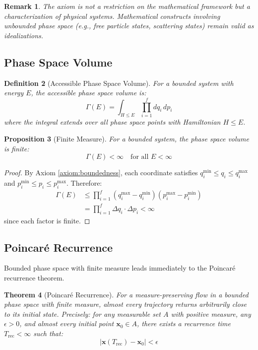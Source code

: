 \documentclass[twocolumn,10pt,twoside]{article}
\newtheorem{theorem}{Theorem}[section]
\newtheorem{proposition}[theorem]{Proposition}
\newtheorem{definition}[theorem]{Definition}
\newtheorem{remark}[theorem]{Remark}
\begin{document}
\begin{remark}
The axiom is not a restriction on the mathematical framework but a characterization of physical systems. Mathematical constructs involving unbounded phase space (e.g., free particle states, scattering states) remain valid as idealizations.
\end{remark}

\subsection{Phase Space Volume}

\begin{definition}[Accessible Phase Space Volume]
For a bounded system with energy $E$, the accessible phase space volume is:
\begin{equation}
\Gamma(E) = \int_{H \leq E} \prod_{i=1}^{f} dq_i \, dp_i
\label{eq:phase_volume}
\end{equation}
where the integral extends over all phase space points with Hamiltonian $H \leq E$.
\end{definition}

\begin{proposition}[Finite Measure]
\label{prop:finite_measure}
For a bounded system, the phase space volume is finite:
\begin{equation}
\Gamma(E) < \infty \quad \text{for all } E < \infty
\end{equation}
\end{proposition}

\begin{proof}
By Axiom \ref{axiom:boundedness}, each coordinate satisfies $q_i^{\min} \leq q_i \leq q_i^{\max}$ and $p_i^{\min} \leq p_i \leq p_i^{\max}$. Therefore:
\begin{align}
\Gamma(E) &\leq \prod_{i=1}^{f} (q_i^{\max} - q_i^{\min})(p_i^{\max} - p_i^{\min}) \\
&= \prod_{i=1}^{f} \Delta q_i \cdot \Delta p_i < \infty
\end{align}
since each factor is finite.
\end{proof}

\subsection{Poincar\'{e} Recurrence}

Bounded phase space with finite measure leads immediately to the Poincar\'{e} recurrence theorem.

\begin{theorem}[Poincar\'{e} Recurrence]
\label{thm:poincare}
For a measure-preserving flow in a bounded phase space with finite measure, almost every trajectory returns arbitrarily close to its initial state. Precisely: for any measurable set $A$ with positive measure, any $\epsilon > 0$, and almost every initial point $\mathbf{x}_0 \in A$, there exists a recurrence time $T_{\text{rec}} < \infty$ such that:
\begin{equation}
|\mathbf{x}(T_{\text{rec}}) - \mathbf{x}_0| < \epsilon
\end{equation}
\end{theorem}
\end{document}
